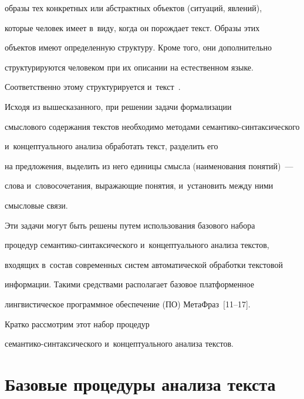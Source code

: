 образы тех конкретных или абстрактных объектов (ситуаций, явлений), 


которые человек имеет в~виду, когда он порождает текст. Образы этих 


объектов имеют определенную структуру. Кроме того, они дополнительно 


структурируются человеком при их описании на естественном языке. 


Соответственно этому структурируется и~текст~\cite{14-kl, 11-kl}.


     


     Исходя из вышесказанного, при решении задачи формализации 


смыслового содержания текстов необходимо методами семантико-синтаксического 


и~концептуального анализа обработать текст, разделить его 


на предложения, выделить из него единицы смысла (наименования понятий)~---


 слова и~словосочетания, выражающие понятия, и~установить между ними 


смысловые связи. 


    


     Эти задачи могут быть решены путем использования базового набора 


процедур се\-ман\-ти\-ко-син\-так\-си\-че\-ско\-го и~концептуального анализа текстов, 


входящих в~состав современных систем автоматической обработки текстовой 


информации. Такими средствами располагает базовое платформенное 


лингвистическое программное обеспечение (ПО) МетаФраз~[11--17].




Кратко рассмотрим этот набор процедур 


се\-ман\-ти\-ко-син\-такси\-че\-ско\-го и~концептуального анализа текстов.





\section{Базовые процедуры анализа текста}


      


